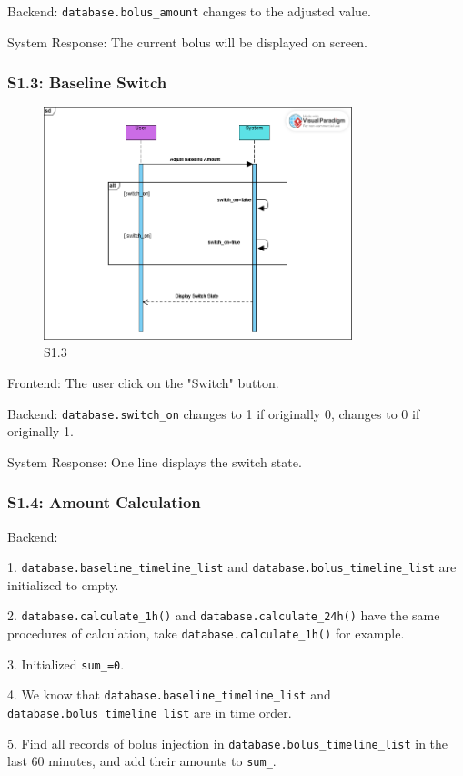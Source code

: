 \documentclass{article}
\begin{document}
Backend: \lstinline!database.bolus_amount! changes to the adjusted value.

System Response: The current bolus will be displayed on screen.
\subsubsection*{S1.3: Baseline Switch}
\begin{figure}[htbp]
  \centering
  \includegraphics[width=0.8\textwidth]{img/S1_3.png}
  \caption{S1.3}
\end{figure}
Frontend: The user click on the "Switch" button.

Backend: \lstinline!database.switch_on! changes to 1 if originally 0, changes to 0 if originally 1.

System Response: One line displays the switch state.
\subsubsection*{S1.4: Amount Calculation}
Backend:

1. \lstinline!database.baseline_timeline_list! and \lstinline!database.bolus_timeline_list! are initialized to empty.

2. \lstinline!database.calculate_1h()! and \lstinline!database.calculate_24h()! have the same procedures of calculation, take \lstinline!database.calculate_1h()! for example.

3. Initialized \lstinline!sum_=0!.

4. We know that \lstinline!database.baseline_timeline_list! and \lstinline!database.bolus_timeline_list! are in time order.

5. Find all records of bolus injection in \lstinline!database.bolus_timeline_list! in the last 60 minutes, and add their amounts to \lstinline!sum_!.
\end{document}
